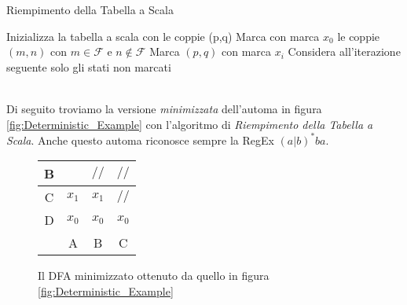 \begin{algorithm}
    \caption{Riempimento della Tabella a Scala} \label{alg:Minimization_Algorithm}
    \begin{algorithmic}
        \State Inizializza la tabella a scala con le coppie (p,q)
        \State Marca con marca $x_0$ le coppie $(m,n)$ con $m \in \mathcal{F}$ e $n \notin \mathcal{F}$
        \State Marca $(p, q)$ con marca $x_i$
        \EndIf
        \State Considera all'iterazione seguente solo gli stati non marcati
        \EndWhile
    \end{algorithmic}
\end{algorithm}\\
Di seguito troviamo la versione \emph{minimizzata} dell'automa in figura \ref{fig:Deterministic_Example} con l'algoritmo di \emph{Riempimento della Tabella a Scala}. Anche questo automa riconosce sempre la RegEx $(a|b)^*ba$.
\begin{figure}[ht]
    \centering
    \space \space \space
    \parbox{5cm}{
        \begin{tabular}{ | c | c | c | c |}
            \hline B &       & $//$  & $//$  \\
            \hline C & $x_1$ & $x_1$ & $//$  \\
            \hline D & $x_0$ & $x_0$ & $x_0$ \\
            \hline   & A     & B     & C     \\
            \hline
        \end{tabular}
    }
    \caption{Il DFA minimizzato ottenuto da quello in figura \ref{fig:Deterministic_Example}}
    \label{fig:Minimization_Example}
\end{figure}\\

